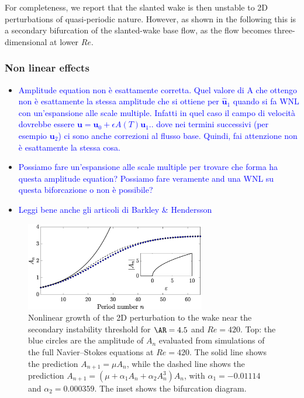 For completeness, we report that the slanted wake is then unstable to 2D perturbations of quasi-periodic nature. However, as shown in the following this is a secondary bifurcation of the slanted-wake base flow, as the flow becomes three-dimensional at lower $Re$.

\subsubsection{Non linear effects}


\begin{itemize}
  \item \textcolor{blue}{ Amplitude equation non è esattamente corretta. Quel valore di A che ottengo non è esattamente la stessa amplitude che si ottiene per $\hat{\bm{u}}_1$ quando si fa WNL con un'espansione alle scale multiple. Infatti in quel caso il campo di velocità dovrebbe essere $\bm{u} = \bm{u}_0 + \epsilon A(T) \bm{u}_1 ..$ dove nei termini successivi (per esempio $\bm{u}_2$) ci sono anche correzioni al flusso base. Quindi, fai attenzione non è esattamente la stessa cosa. }
  \item \textcolor{blue}{ Possiamo fare un'espansione alle scale multiple per trovare che forma ha questa amplitude equation? Possiamo fare veramente and una WNL su questa biforcazione o non è possibile? }
  \item \textcolor{blue}{ Leggi bene anche gli articoli di Barkley \& Hendersson }
\end{itemize}


\begin{figure}
  \centering
  \includegraphics[width=0.7\textwidth]{./fig/AR4p5/Nlgrowth_Re420.eps}
  \caption{Nonlinear growth of the 2D perturbation to the wake near the secondary instability threshold for $\AR=4.5$ and $Re=420$. Top: the blue circles are the amplitude of $A_n$ evaluated from simulations of the full Navier--Stokes equations at $Re=420$. The solid line shows the prediction $A_{n+1} = \mu A_n$, while the dashed line shows the prediction $A_{n+1} = ( \mu + \alpha_1 A_n + \alpha_2 A_n^3 ) A_n$, with $\alpha_1 = -0.01114$ and $\alpha_2 = 0.000359$. The inset shows the bifurcation diagram.}
  \label{fig:ar4p5_nnl}
\end{figure}

